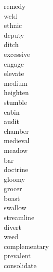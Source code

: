 \documentclass[a4paper, 11pt]{ctexart}
\begin{document}
\begin{multicols*}{3}
\begin{description}
\item[remedy]

\item[weld]

\item[ethnic]

\item[deputy]

\item[ditch]

\item[excessive]

\item[engage]

\item[elevate]

\item[medium]

\item[heighten]

\item[stumble]

\item[cabin]

\item[audit]

\item[chamber]

\item[medieval]

\item[meadow]

\item[bar]

\item[doctrine]

\item[gloomy]

\item[grocer]

\item[boast]

\item[swallow]

\item[streamline]

\item[divert]

\item[weed]

\item[complementary]

\item[prevalent]

\item[consolidate]


\end{description}
\end{multicols*}
\end{document}
